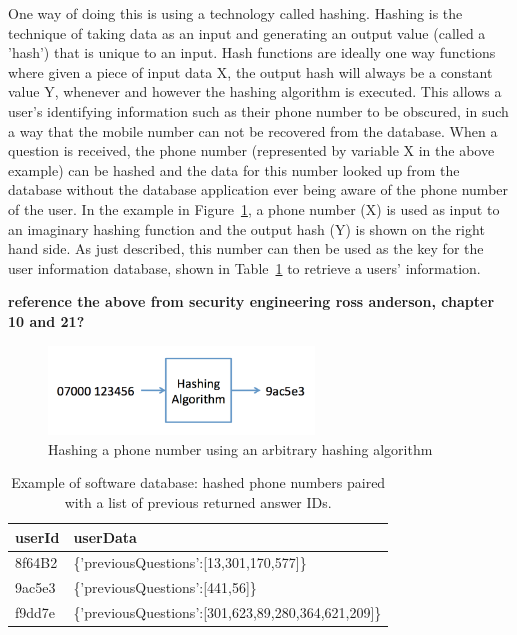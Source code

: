 \documentclass[authoryearcitations]{UoYCSproject}
\begin{document}
One way of doing this is using a technology called hashing.  Hashing is the technique of taking data as an input and generating an output value (called a 'hash') that is unique to an input.  Hash functions are ideally one way functions where given a piece of input data X, the output hash will always be a constant value Y, whenever and however the hashing algorithm is executed.  This allows a user's identifying information such as their phone number to be obscured, in such a way that the mobile number can not be recovered from the database.  When a question is received, the phone number (represented by variable X in the above example) can be hashed and the data for this number looked up from the database without the database application ever being aware of the phone number of the user.  In the example in Figure~\ref{fig:hashPhoneNumber}, a phone number (X) is used as input to an imaginary hashing function and the output hash (Y) is shown on the right hand side.  As just described, this number can then be used as the key for the user information database, shown in Table~\ref{table:hashDatabase} to retrieve a users' information.

{\bf reference the above from security engineering ross anderson, chapter 10 and 21?}

\begin{figure}[htb]
    \centering
    \includegraphics[width=200pt]{hashPhoneNumber}
    \caption{Hashing a phone number using an arbitrary hashing algorithm}
    \label{fig:hashPhoneNumber}
\end{figure}

\begin{table}
\begin{center}
    \begin{tabular}{| l | l |}
    \hline
    userId & userData \\ \hline
    8f64B2 & \{'previousQuestions':[13,301,170,577]\} \\ \hline
    9ac5e3 & \{'previousQuestions':[441,56]\} \\ \hline
    f9dd7e & \{'previousQuestions':[301,623,89,280,364,621,209]\} \\
    \hline
    \end{tabular}
    \caption{Example of software database: hashed phone numbers paired with a list of previous returned answer IDs. }
    \label{table:hashDatabase}
\end{center}
\end{table}
\end{document}
